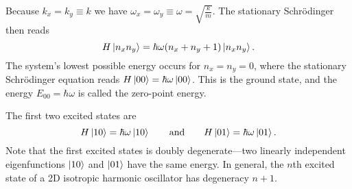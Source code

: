 \documentclass[11pt, a4paper]{article}
\newcommand{\eqtext}[1]{\qquad \text{#1} \qquad}
\newcommand{\Schro}{Schr\"{o}dinger\xspace}
\begin{document}
\begin{itemize}
	Because $ k_{x} = k_{y} \equiv k $ we have $ \omega_{x} = \omega_{y} \equiv \omega = \sqrt{\frac{k}{m}}$. The stationary \Schro then reads
	\begin{equation*}
		H\ket{n_{x}n_{y}} = \hbar \omega (n_{x} + n_{y} + 1)\ket{n_{x}n_{y}}.
	\end{equation*}
	The system's lowest possible energy occurs for $ n_{x} = n_{y} = 0 $, where the stationary \Schro equation reads $ H\ket{00} = \hbar \omega \ket{00} $. This is the ground state, and the energy $ E_{00} = \hbar \omega $ is called the zero-point energy. 
	
	The first two excited states are
	\begin{equation*}
		H\ket{10} = \hbar \omega \ket{10} \eqtext{and} H\ket{01} = \hbar \omega \ket{01}.
	\end{equation*}
	Note that the first excited states is doubly degenerate---two linearly independent eigenfunctions $ \ket{10} $ and $ \ket{01} $ have the same energy. In general, the $ n $th excited state of a 2D isotropic harmonic oscillator has degeneracy $ n +1 $. 
\end{itemize}
\end{document}
